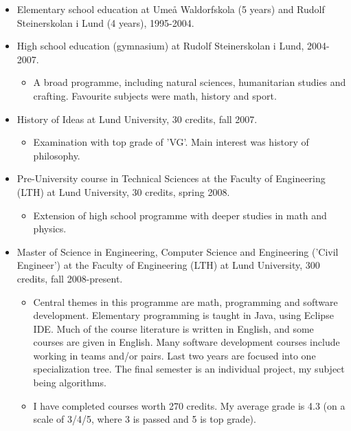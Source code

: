 \documentclass[a4paper]{article}
\begin{document}
\begin{itemize}
 \item Elementary school education at Umeå Waldorfskola (5 years) and Rudolf Steinerskolan i Lund (4 years), 1995-2004.
 
 \item High school education (gymnasium) at Rudolf Steinerskolan i Lund, 2004-2007.
 \begin{itemize}
  \item A broad programme, including natural sciences, humanitarian studies and crafting. Favourite subjects were math, history and sport.
 \end{itemize}
 
 \item History of Ideas at Lund University, 30 credits, fall 2007.
 \begin{itemize}
  \item Examination with top grade of 'VG'. Main interest was history of philosophy.
 \end{itemize}
 
 \item Pre-University course in Technical Sciences at the Faculty of Engineering (LTH) at Lund University, 30 credits, spring 2008.
 \begin{itemize}
  \item Extension of high school programme with deeper studies in math and physics.
 \end{itemize}
 
 \item Master of Science in Engineering, Computer Science and Engineering ('Civil Engineer') at the Faculty of Engineering (LTH) at Lund University, 300 credits, fall 2008-present.
 \begin{itemize}
  \item Central themes in this programme are math, programming and software development. Elementary programming is taught in Java, using Eclipse IDE. Much of the course literature is written in English, and some courses are given in English. Many software development courses include working in teams and/or pairs. Last two years are focused into one specialization tree. The final semester is an individual project, my subject being algorithms.
  \item I have completed courses worth 270 credits. My average grade is 4.3 (on a scale of 3/4/5, where 3 is passed and 5 is top grade).
 \end{itemize}

\end{itemize}
\end{document}
